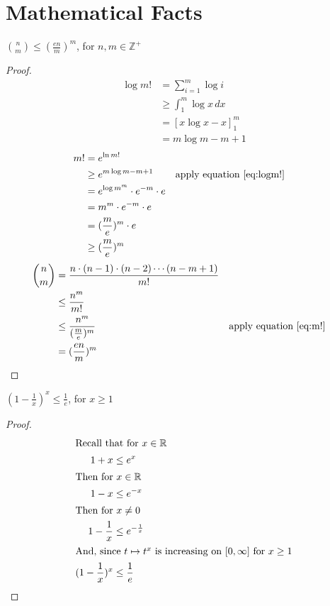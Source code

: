 \chapter{Mathematical Facts}

\begin{lemma}
\label{lemma:nchoosem}

$\binom{n}{m} \le (\frac{en}{m})^m$, for $n, m \in \mathbb{Z}^+$

\end{lemma}
\begin{proof}
\begin{align}
\log m! 
    &= \sum_{i=1}^{m} \log i \nonumber \\
    &\ge \int_1^m \log x \, dx \nonumber \\
    &= [x \log x - x]_1^m \nonumber \\
    &= m \log m - m + 1 \label{eq:logm!}
\end{align}
\begin{align}
m! 
    &= e^{\ln m!} \nonumber \\
    &\ge e^{m \log m - m + 1} \nonumber 
    && \text{apply equation \ref{eq:logm!}} \\
    &= e^{\log m^m} \cdot e^{-m} \cdot e \nonumber \\
    &= m^m \cdot e^{-m} \cdot e \nonumber \\
    &= (\frac{m}{e})^m \cdot e \nonumber \\
    &\ge (\frac{m}{e})^m \label{eq:m!}
\end{align}
\begin{align}
\binom{n}{m} 
    &= \frac{n \cdot (n-1) \cdot (n-2) \cdots (n-m+1)}{m!} \nonumber \\
    &\le \frac{n^m}{m!} \nonumber \\
    &\le \frac{n^m}{(\frac{m}{e})^m} \nonumber 
    && \text{apply equation \ref{eq:m!}} \\
    &= (\frac{en}{m})^m
\end{align}
\end{proof}

\begin{lemma}
\label{lemma:(1-1x)x}

$(1 - \frac{1}{x})^x \le \frac{1}{e}$, for $x \ge 1$

\end{lemma}

\begin{proof}

\begin{align}
\shortintertext{Recall that for $x \in \mathbb{R}$}
    1 + x &\le e^x \nonumber \\
\shortintertext{Then for $x \in \mathbb{R}$}
    1 - x &\le e^{-x} \nonumber \\
\shortintertext{Then for $x \neq 0$}
    1 - \frac{1}{x} &\le e^{-\frac{1}{x}} \nonumber \\ 
\shortintertext{And, since $t \mapsto t^x$ is increasing on $[0, \infty]$ for $x \ge 1$}
   (1 - \frac{1}{x})^x &\le \frac{1}{e}
\end{align}

\end{proof}

